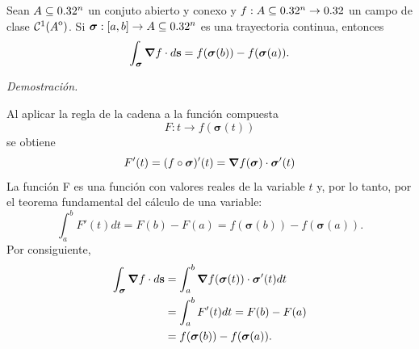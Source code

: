 \begin{theorem} \label{thm:t1}

    Sean $A\subseteq0.32^n$ un conjuto abierto y conexo y  $f:A\subseteq0.32^n\to0.32$ un campo de clase $\mathcal{C}^1({\kern0ptA}^{\mathrm{o}})$. Si $\boldsymbol{\sigma}:[a,b]\to A\subseteq0.32^n$ es una trayectoria continua,  entonces
    \[
       \int_{\boldsymbol{\sigma}}\grad f\cdot d\mathbf{s}=f(\boldsymbol{\sigma}(b))-f(\boldsymbol{\sigma}(a)).
    \]    

    \textit{Demostración.}

    Al aplicar la regla de la cadena a la función compuesta
    \begin{equation*}
        F:t \rightarrow f(\boldsymbol{\sigma}(t))
    \end{equation*}
    se obtiene
    \begin{equation*}
        F'(t)=(f\circ\boldsymbol{\sigma})'(t)=\grad{f(\boldsymbol{\sigma})}\cdot\boldsymbol{\sigma}'(t)
    \end{equation*}
    La función F es una función con valores reales de la variable $t$ y, por lo tanto, por el teorema fundamental
    del cálculo de una variable:
    \begin{equation*}
        \int_{a}^{b}F'(t)dt=F(b)-F(a)=f(\boldsymbol{\sigma}(b))-f(\boldsymbol{\sigma}(a)).
    \end{equation*}
    Por consiguiente,
    \begin{align*}
        \int_{\boldsymbol{\sigma}}\grad f\cdot d\mathbf{s}&=\int_{a}^{b}\grad{f(\boldsymbol{\sigma}(t))}\cdot\boldsymbol{\sigma}'(t)dt\\
        &=\int_{a}^{b}F'(t)dt=F(b)-F(a)\\
        &=f(\boldsymbol{\sigma}(b))-f(\boldsymbol{\sigma}(a)).
    \end{align*}
\end{theorem}



